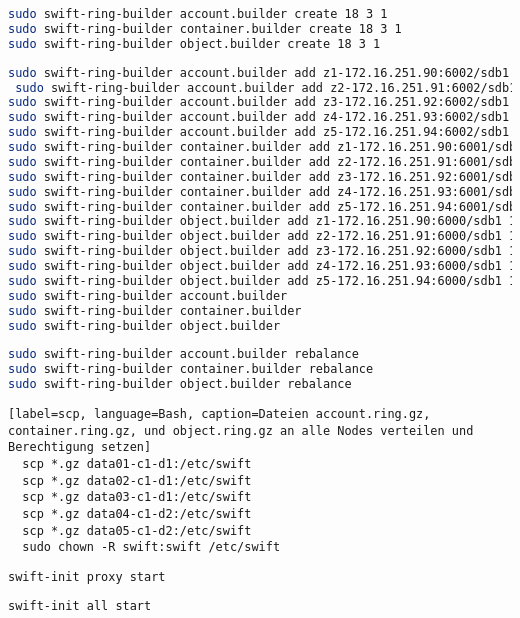 \begin{lstlisting}[label=ring_create, language=Bash, caption=Account Container und Object Ring erstellen]
sudo swift-ring-builder account.builder create 18 3 1
sudo swift-ring-builder container.builder create 18 3 1
sudo swift-ring-builder object.builder create 18 3 1
\end{lstlisting}

\begin{lstlisting}[label=ring_add, language=Bash, caption=Server bzw. Speicher den Ringen hinzufügen]
sudo swift-ring-builder account.builder add z1-172.16.251.90:6002/sdb1 100
 sudo swift-ring-builder account.builder add z2-172.16.251.91:6002/sdb1 100
sudo swift-ring-builder account.builder add z3-172.16.251.92:6002/sdb1 100
sudo swift-ring-builder account.builder add z4-172.16.251.93:6002/sdb1 100
sudo swift-ring-builder account.builder add z5-172.16.251.94:6002/sdb1 100
sudo swift-ring-builder container.builder add z1-172.16.251.90:6001/sdb1 100
sudo swift-ring-builder container.builder add z2-172.16.251.91:6001/sdb1 100
sudo swift-ring-builder container.builder add z3-172.16.251.92:6001/sdb1 100
sudo swift-ring-builder container.builder add z4-172.16.251.93:6001/sdb1 100
sudo swift-ring-builder container.builder add z5-172.16.251.94:6001/sdb1 100
sudo swift-ring-builder object.builder add z1-172.16.251.90:6000/sdb1 100
sudo swift-ring-builder object.builder add z2-172.16.251.91:6000/sdb1 100
sudo swift-ring-builder object.builder add z3-172.16.251.92:6000/sdb1 100
sudo swift-ring-builder object.builder add z4-172.16.251.93:6000/sdb1 100
sudo swift-ring-builder object.builder add z5-172.16.251.94:6000/sdb1 100
sudo swift-ring-builder account.builder
sudo swift-ring-builder container.builder
sudo swift-ring-builder object.builder
\end{lstlisting}

\begin{lstlisting}[label=ring_rebalance, language=Bash, caption=Ring rebalance]
sudo swift-ring-builder account.builder rebalance
sudo swift-ring-builder container.builder rebalance
sudo swift-ring-builder object.builder rebalance
\end{lstlisting}

\begin{lstlisting}[label=scp, language=Bash, caption=Dateien account.ring.gz, container.ring.gz, und object.ring.gz an alle Nodes verteilen und Berechtigung setzen]
  scp *.gz data01-c1-d1:/etc/swift
  scp *.gz data02-c1-d1:/etc/swift  
  scp *.gz data03-c1-d1:/etc/swift
  scp *.gz data04-c1-d2:/etc/swift
  scp *.gz data05-c1-d2:/etc/swift
  sudo chown -R swift:swift /etc/swift
\end{lstlisting}

\begin{lstlisting}[label=startproxy, language=Bash, caption=Proxy Dienst starten]
swift-init proxy start
\end{lstlisting}

\begin{lstlisting}[label=start_datanode, language=Bash, caption=Auf allen Nodes die Dienste starten]
swift-init all start
\end{lstlisting}